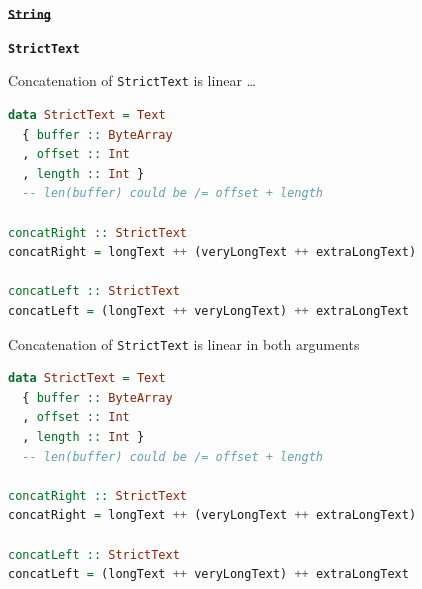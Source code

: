 \documentclass[handout]{beamer}
\begin{document}

\begin{frame}[fragile]


\begin{block}{}
\bigskip
\centerline{\Huge\bf \color{ukraine-blue} \st{\tt String}}
\bigskip
\end{block}

\begin{block}{}
\bigskip
\centerline{\Huge\bf \color{ukraine-blue} {\tt StrictText}}
\bigskip
\end{block}

\end{frame}


\begin{frame}[fragile]{Concatenation of {\tt StrictText} is linear \dots}
\begin{lstlisting}[language=Haskell]
data StrictText = Text
  { buffer :: ByteArray
  , offset :: Int
  , length :: Int }
  -- len(buffer) could be /= offset + length

concatRight :: StrictText
concatRight = longText ++ (veryLongText ++ extraLongText)

concatLeft :: StrictText
concatLeft = (longText ++ veryLongText) ++ extraLongText
\end{lstlisting}
\end{frame}

\begin{frame}[fragile]{Concatenation of {\tt StrictText} is linear in both arguments}
\begin{lstlisting}[language=Haskell]
data StrictText = Text
  { buffer :: ByteArray
  , offset :: Int
  , length :: Int }
  -- len(buffer) could be /= offset + length

concatRight :: StrictText
concatRight = longText ++ (veryLongText ++ extraLongText)

concatLeft :: StrictText
concatLeft = (longText ++ veryLongText) ++ extraLongText
\end{lstlisting}
\end{frame}
\end{document}
